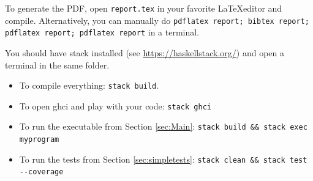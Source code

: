 

To generate the PDF, open \texttt{report.tex} in your favorite \LaTeX editor and compile.
Alternatively, you can manually do
\texttt{pdflatex report; bibtex report; pdflatex report; pdflatex report} in a terminal.

You should have stack installed (see \url{https://haskellstack.org/}) and
open a terminal in the same folder.

\begin{itemize}
  \item To compile everything: \verb|stack build|.
  \item To open ghci and play with your code: \verb|stack ghci|
  \item To run the executable from Section \ref{sec:Main}: \verb|stack build && stack exec myprogram|
  \item To run the tests from Section \ref{sec:simpletests}: \verb|stack clean && stack test --coverage|
\end{itemize}
